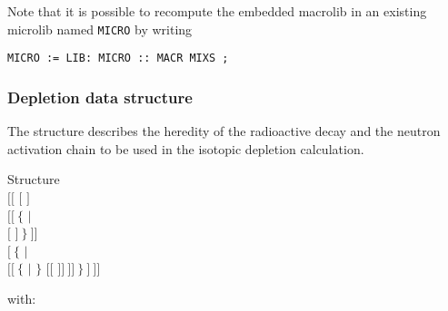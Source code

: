 Note that it is possible to recompute the embedded macrolib in an existing microlib
named {\tt MICRO} by writing
\begin{verbatim}
MICRO := LIB: MICRO :: MACR MIXS ;
\end{verbatim}

\clearpage

\subsubsection{Depletion data structure}\label{sect:descdepl}

The structure  describes the heredity of the radioactive decay
and the neutron activation chain to be used in the isotopic depletion
calculation.
\begin{DataStructure}{Structure }
 \\
$[[$  $[$  $]$ \\
\hskip 1.0cm $[[~\{$   $|$ \\
\hskip 2.0cm  $[$  $]~\}~]]$ \\
\hskip 1.0cm $[~\{$  $|$ \\
\hskip 2.0cm  $[[~\{$  $|$  $\}$
$[[$   $]]~]]~\}~]~]]$\\
\end{DataStructure}

\noindent
with:

